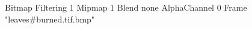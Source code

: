 {Bitmap
	{Filtering 1}
	{Mipmap 1}
	{Blend none}
	{AlphaChannel 0}
	{Frame "leaves#burned.tif.bmp"}
}
